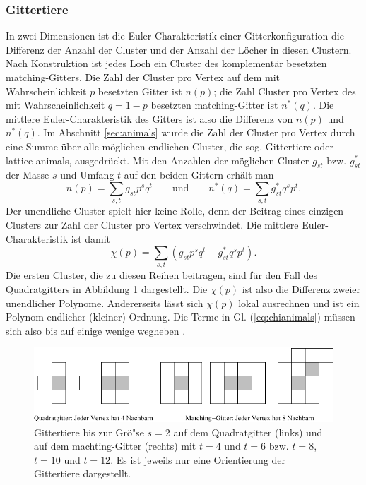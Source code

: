 \subsubsection{Gittertiere}
In zwei Dimensionen ist die Euler-Charakteristik einer Gitterkonfiguration die Differenz der Anzahl der Cluster und der Anzahl der L\"ocher in diesen Clustern. Nach Konstruktion ist jedes Loch ein Cluster des komplement\"ar besetzten matching-Gitters. Die Zahl der Cluster pro Vertex auf dem mit Wahrscheinlichkeit $p$ besetzten Gitter ist $n(p)$; die Zahl Cluster pro Vertex des mit Wahrscheinlichkeit $q=1-p$ besetzten matching-Gitter ist $n^*(q)$. Die mittlere Euler-Charakteristik des Gitters ist also die Differenz von $n(p)$ und $n^*(q)$. Im Abschnitt \ref{sec:animals} wurde die Zahl der Cluster pro Vertex durch eine Summe \"uber alle m\"oglichen endlichen Cluster, die sog. Gittertiere oder lattice animals, ausgedr\"uckt. Mit den Anzahlen der m\"oglichen Cluster $g_{st}$ bzw. $g^*_{st}$ der Masse $s$ und Umfang $t$ auf den beiden Gittern erh\"alt man 
\begin{equation}
n(p)=\sum_{s,t}g_{st}p^sq^t \qquad \text{und} \qquad n^*(q)=\sum_{s,t}g^*_{st}q^sp^t.
\end{equation}  
Der unendliche Cluster spielt hier keine Rolle, denn der Beitrag eines einzigen Clusters zur Zahl der Cluster pro Vertex verschwindet. 
Die mittlere Euler-Charakteristik ist damit
\begin{equation}
  \label{eq:chianimals}
  \chi(p)=\sum_{s,t} \left(g_{st}p^sq^t-g^*_{st}q^sp^t\right).
\end{equation}
Die ersten Cluster, die zu diesen Reihen beitragen, sind f\"ur den Fall des Quadratgitters in Abbildung \ref{fig:animals} dargestellt. Die $\chi(p)$ ist also die Differenz zweier unendlicher Polynome. Andererseits l\"asst sich $\chi(p)$ lokal ausrechnen und ist ein Polynom endlicher (kleiner) Ordnung. Die Terme in Gl. (\ref{eq:chianimals}) m\"ussen sich also bis auf einige wenige wegheben \cite{Sykes:64}.
\begin{figure}[tbp]
  \centering
  \includegraphics{./Euler-figs/animals}
  \caption{Gittertiere bis zur Gr\"o"se $s=2$ auf dem Quadratgitter (links) und auf dem machting-Gitter (rechts) mit $t=4$ und $t=6$ bzw. $t=8$, $t=10$ und $t=12$. Es ist jeweils nur eine Orientierung der Gittertiere dargestellt.}
  \label{fig:animals}
\end{figure}
